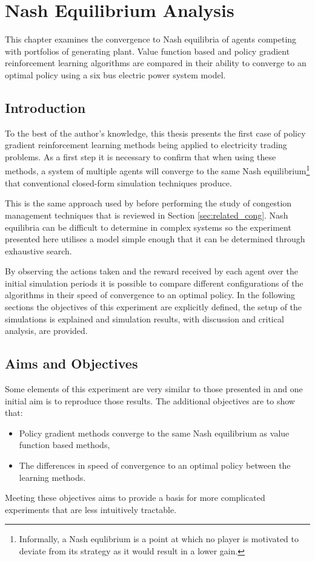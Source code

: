 \chapter{Nash Equilibrium Analysis}
\label{ch:nashanalysis}
This chapter examines the convergence to Nash
equilibria of agents competing with portfolios of generating plant.  Value
function based and policy gradient reinforcement learning algorithms are
compared in their ability to converge to an optimal policy using a six bus
electric power system model.

\section{Introduction}
To the best of the author's knowledge, this thesis presents the first case of
policy gradient reinforcement learning methods being applied to electricity
trading problems.  As a first step it is necessary to confirm that when using
these methods, a system of multiple agents will converge to the same Nash
equilibrium\footnote{Informally, a Nash equlibrium is a point at which no
player is motivated to deviate from its strategy as it would result in a lower
gain.} that conventional closed-form simulation techniques produce.

This is the same approach used by  before performing the
study of congestion management techniques that is reviewed in Section
\ref{sec:related_cong}.  Nash equilibria can be difficult
to determine in complex systems so the experiment presented here utilises a
model simple enough that it can be determined through exhaustive search.

By observing the actions taken and the reward received by each agent over the
initial simulation periods it is possible to compare different configurations
of the algorithms in their speed of convergence to an optimal policy.  In the
following sections the objectives of this experiment are explicitly defined,
the setup of the simulations is explained and simulation results, with discussion
and critical analysis, are provided.

\section{Aims and Objectives}
Some elements of this experiment are very similar to those presented in
 and one initial aim is to reproduce those results.
The additional objectives are to show that:
\begin{itemize}
  \item Policy gradient methods converge to the same Nash equilibrium as value
  function based methods,
  \item The differences in speed of convergence to an optimal policy between
  the learning methods.
\end{itemize}
Meeting these objectives aims to provide a basis for more complicated
experiments that are less intuitively tractable.

